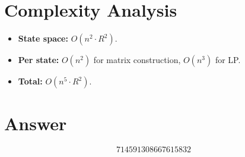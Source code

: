 \documentclass[11pt]{article}
\begin{document}
\section{Complexity Analysis}
\begin{itemize}
    \item \textbf{State space:} $O(n^2 \cdot R^2)$.
    \item \textbf{Per state:} $O(n^2)$ for matrix construction, $O(n^3)$ for LP.
    \item \textbf{Total:} $O(n^5 \cdot R^2)$.
\end{itemize}

\section{Answer}

\[
\boxed{714591308667615832}
\]
\end{document}

